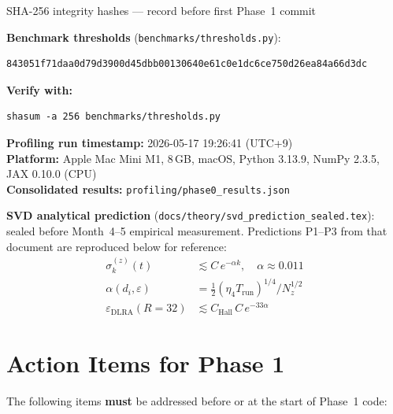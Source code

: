 \documentclass[11pt, a4paper]{article}
\begin{document}
\begin{sealbox}{SHA-256 integrity hashes --- record before first Phase~1 commit}

\textbf{Benchmark thresholds} (\texttt{benchmarks/thresholds.py}):
\begin{lstlisting}
843051f71daa0d79d3900d45dbb00130640e61c0e1dc6ce750d26ea84a66d3dc
\end{lstlisting}

\textbf{Verify with:}
\begin{lstlisting}
shasum -a 256 benchmarks/thresholds.py
\end{lstlisting}

\textbf{Profiling run timestamp:} 2026-05-17 19:26:41 (UTC+9)\\
\textbf{Platform:} Apple Mac Mini M1, 8\,GB, macOS, Python 3.13.9, NumPy 2.3.5, JAX 0.10.0 (CPU)\\
\textbf{Consolidated results:} \texttt{profiling/phase0\_results.json}

\medskip
\noindent
\textbf{SVD analytical prediction} (\texttt{docs/theory/svd\_prediction\_sealed.tex}):
sealed before Month~4--5 empirical measurement.
Predictions P1--P3 from that document are reproduced below for reference:
\begin{align*}
  \sigma_k^{(z)}(t) &\lesssim C\,e^{-\alpha k},
  \quad \alpha \approx 0.011 \tag{P1} \\
  \alpha(d_i,\varepsilon) &= \tfrac{1}{2}(\eta_4 T_\text{run})^{1/4} / N_z^{1/2}
  \tag{P2} \\
  \varepsilon_\text{DLRA}(R=32) &\lesssim C_\text{Hall}\,C\,e^{-33\alpha}
  \tag{P3}
\end{align*}
\end{sealbox}

\section{Action Items for Phase 1}
\label{sec:actions}

The following items \textbf{must} be addressed before or at the start of
Phase~1 code:
\end{document}
